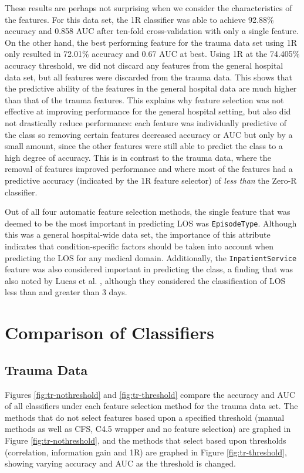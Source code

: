 These results are perhaps not surprising when we consider the characteristics
of the features. For this data set, the 1R classifier was able to achieve
92.88\% accuracy and
0.858 AUC after ten-fold cross-validation with only a single feature. On the
other hand, the best
performing feature for the trauma data set using 1R only resulted in 72.01\%
accuracy and 0.67 AUC at best. Using 1R at the 74.405\% accuracy threshold,
we did not discard any features from the general hospital data set, but all
features were discarded from the trauma data. This shows that the predictive
ability of the features in the general hospital data are much higher than
that of the trauma features. This explains why feature
selection was not effective at improving performance for the general hospital
setting, but also did not drastically reduce performance: each feature
was individually predictive of the
class so removing certain features decreased accuracy or AUC but only by a
small amount, since the other features were still able to predict the class
to a high degree of accuracy. This is in contrast to the trauma data, where
the removal of features improved performance and where most of the features
had a predictive accuracy (indicated by the 1R feature selector) of
\textit{less than} the Zero-R classifier.

Out of all four automatic feature selection methods, the single feature that
was deemed to be the most important in predicting LOS was \texttt{EpisodeType}.
Although this was a general hospital-wide data set, the importance of this
attribute indicates that condition-specific factors should be taken into
account when predicting the LOS for any medical domain. Additionally, the
\texttt{InpatientService} feature was also considered important in predicting
the class, a finding that was also noted by Lucas et al. \cite{Lucas2009},
although they considered the classification of LOS less than and greater than
3 days.

\section{Comparison of Classifiers}
\subsection{Trauma Data}
Figures \ref{fig:tr-nothreshold} and \ref{fig:tr-threshold} compare the
accuracy and AUC of all classifiers under each feature selection method for
the trauma data set.
The methods that do not select features based upon a specified threshold
(manual methods as well as CFS, C4.5 wrapper and no feature selection)
are graphed in Figure \ref{fig:tr-nothreshold}, and the methods that select
based upon thresholds (correlation, information gain and 1R) are graphed
in Figure \ref{fig:tr-threshold}, showing varying accuracy and AUC as the
threshold is changed.

